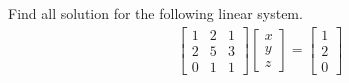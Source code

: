 \begin{exmp}
\label{exmp:mulsol}
Find all solution for the following linear system.
\begin{align*}
\begin{bmatrix}
1 & 2 & 1 \\
2 & 5 & 3 \\
0 & 1 & 1 
\end{bmatrix}
\begin{bmatrix}
x \\
y \\
z
\end{bmatrix}
=
\begin{bmatrix}
1 \\
2 \\
0
\end{bmatrix}   
\end{align*}
\end{exmp}

